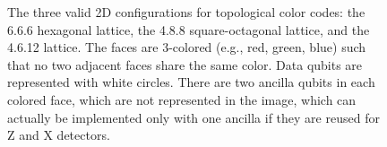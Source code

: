 \begin{figure}[htbp]
    \centering

    \begin{subfigure}[b]{0.3\textwidth}
        \centering
        
        \caption{}
        \label{fig:2:lattice_666}
    \end{subfigure}
    \hfill
    \begin{subfigure}[b]{0.3\textwidth}
        \centering
        
        \caption{}
        \label{fig:2:lattice_488}
    \end{subfigure}
    \hfill
    \begin{subfigure}[b]{0.3\textwidth}
        \centering
        
        \caption{}
        \label{fig:2:lattice_4612}
    \end{subfigure}

    \caption[The three valid 2D configurations for topological color codes.]{The three valid 2D configurations for topological color codes: the 6.6.6 hexagonal lattice, the 4.8.8 square-octagonal lattice, and the 4.6.12 lattice. The faces are 3-colored (e.g., red, green, blue) such that no two adjacent faces share the same color. Data qubits are represented with white circles. There are two ancilla qubits in each colored face, which are not represented in the image, which can actually be implemented only with one ancilla if they are reused for Z and X detectors.}
    \label{fig:2:color_code_lattices}
\end{figure}

